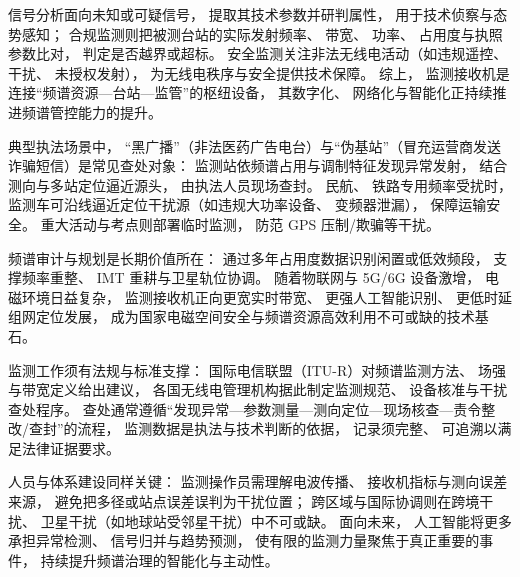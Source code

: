 信号分析面向未知或可疑信号，
提取其技术参数并研判属性，
用于技术侦察与态势感知；
合规监测则把被测台站的实际发射频率、
带宽、
功率、
占用度与执照参数比对，
判定是否越界或超标。
安全监测关注非法无线电活动（如违规遥控、
干扰、
未授权发射），
为无线电秩序与安全提供技术保障。
综上，
监测接收机是连接“频谱资源—台站—监管”的枢纽设备，
其数字化、
网络化与智能化正持续推进频谱管控能力的提升。

典型执法场景中，
“黑广播”（非法医药广告电台）与“伪基站”（冒充运营商发送诈骗短信）是常见查处对象：
监测站依频谱占用与调制特征发现异常发射，
结合测向与多站定位逼近源头，
由执法人员现场查封。
民航、
铁路专用频率受扰时，
监测车可沿线逼近定位干扰源（如违规大功率设备、
变频器泄漏），
保障运输安全。
重大活动与考点则部署临时监测，
防范 GPS 压制/欺骗等干扰。

频谱审计与规划是长期价值所在：
通过多年占用度数据识别闲置或低效频段，
支撑频率重整、
IMT 重耕与卫星轨位协调。
随着物联网与 5G/6G 设备激增，
电磁环境日益复杂，
监测接收机正向更宽实时带宽、
更强人工智能识别、
更低时延组网定位发展，
成为国家电磁空间安全与频谱资源高效利用不可或缺的技术基石。

监测工作须有法规与标准支撑：
国际电信联盟（ITU-R）对频谱监测方法、
场强与带宽定义给出建议，
各国无线电管理机构据此制定监测规范、
设备核准与干扰查处程序。
查处通常遵循“发现异常—参数测量—测向定位—现场核查—责令整改/查封”的流程，
监测数据是执法与技术判断的依据，
记录须完整、
可追溯以满足法律证据要求。

人员与体系建设同样关键：
监测操作员需理解电波传播、
接收机指标与测向误差来源，
避免把多径或站点误差误判为干扰位置；
跨区域与国际协调则在跨境干扰、
卫星干扰（如地球站受邻星干扰）中不可或缺。
面向未来，
人工智能将更多承担异常检测、
信号归并与趋势预测，
使有限的监测力量聚焦于真正重要的事件，
持续提升频谱治理的智能化与主动性。
